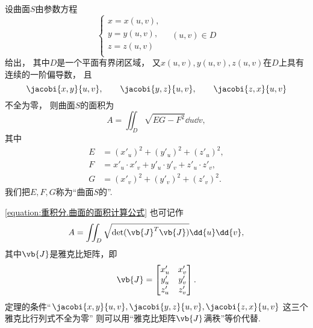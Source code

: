 \begin{theorem}[利用曲面的参数方程求曲面的面积]
设曲面\(S\)由参数方程\begin{equation*}
	\left\{ \begin{array}{l}
		x = x(u,v), \\
		y = y(u,v), \\
		z = z(u,v) \\
	\end{array} \right.
	\quad
	(u,v) \in D
\end{equation*}给出，
其中\(D\)是一个平面有界闭区域，
又\(x(u,v), y(u,v), z(u,v)\)在\(D\)上具有连续的一阶偏导数，
且\begin{equation*}
	\jacobi{x,y}{u,v}, \qquad
	\jacobi{y,z}{u,v}, \qquad
	\jacobi{z,x}{u,v}
\end{equation*}不全为零，
则曲面\(S\)的面积为
\begin{equation}\label{equation:重积分.曲面的面积计算公式}
	A = \iint_D \sqrt{E G - F^2} \dd{u}\dd{v},
\end{equation}
其中\begin{align*}
	E &= (x'_u)^2 + (y'_u)^2 + (z'_u)^2, \\
	F &= x'_u \cdot x'_v + y'_u \cdot y'_v + z'_u \cdot z'_v, \\
	G &= (x'_v)^2 + (y'_v)^2 + (z'_v)^2.
\end{align*}
\rm
我们把\(E,F,G\)称为“曲面\(S\)的”.
\end{theorem}

\cref{equation:重积分.曲面的面积计算公式} 也可记作\begin{equation*}
	A = \iint_D \sqrt{\det(\vb{J}^T \vb{J})} \dd{u}\dd{v},
\end{equation*}
其中\(\vb{J}\)是雅克比矩阵，即\begin{equation*}
	\vb{J} = \begin{bmatrix}
		x'_u & x'_v \\
		y'_u & y'_v \\
		z'_u & z'_v
	\end{bmatrix}.
\end{equation*}
定理的条件“\(\jacobi{x,y}{u,v},
\jacobi{y,z}{u,v},
\jacobi{z,x}{u,v}\)
这三个雅克比行列式不全为零”
则可以用“雅克比矩阵\(\vb{J}\)满秩”等价代替.



